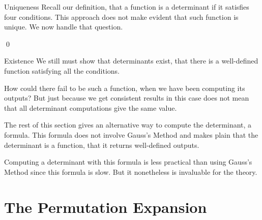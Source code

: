 \documentclass[9pt,t]{beamer}
\begin{document}
\begin{frame}{Uniqueness}
Recall our definition, that a function is a determinant if
it satisfies four conditions.
This approach does not make evident that 
such function is unique.
We now handle that question. 

\pause
\lm[lm:DetFcnIsUnique]

\pause 
\pf 
{}
\qed
\end{frame}
\begin{frame}{Existence}
We still must show that determinants exist, that there is a 
well-defined function satisfying all the conditions.

How could there fail to be such a function, when we have been 
computing its outputs?
But just because we get consistent results in this case
does not mean that all determinant computations
give the same value.
\end{frame}
\begin{frame}

The rest of this section gives an alternative way to compute
the determinant, a formula.
This formula does not involve Gauss's Method and
makes plain that the determinant is a function, 
that it returns well-defined outputs.

Computing a determinant with this formula  
is less practical than using Gauss's Method since this formula
is slow.
But it nonetheless is invaluable for the theory.
\end{frame}




\section{The Permutation Expansion}
\end{document}
